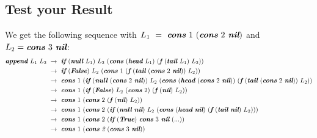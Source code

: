 \documentclass{report}
\begin{document}
		\subsection{Test your Result}
		\startsubsection
			We get the following sequence with $L_1 \ = \ \textit{\textbf{cons} } 1 \ (\textit{\textbf{cons} } 2 \textit{ \textbf{nil}})$ and $L_2 = \textit{\textbf{cons} } 3 \textit{ \textbf{nil}}$:
			\begin{align*}
				\textit{\textbf{append} } L_1 \ L_2 \ & \rightarrow \ \textit{\textbf{if} } (\textit{\textbf{null} } L_1) \ L_2 \ (\textit{\textbf{cons} } (\textit{\textbf{head} } L_1) \ (\textit{\textbf{f} } (\textit{\textbf{tail} } L_1) \ L_2)) \\
				& \rightarrow \ \textit{\textbf{if} } (\textit{\textbf{False}}) \ L_2 \ (\textit{\textbf{cons} } 1 \ (\textit{\textbf{f} } (\textit{\textbf{tail} } (\textit{\textbf{cons} } 2 \textit{ \textbf{nil}})) \ L_2)) \\
				& \rightarrow \ \textit{\textbf{cons} } 1 \ (\textit{\textbf{if} } (\textit{\textbf{null} } (\textit{\textbf{cons} } 2 \textit{ \textbf{nil}})) \ L_2 \ (\textit{\textbf{cons} } (\textit{\textbf{head} } (\textit{\textbf{cons} } 2 \textit{ \textbf{nil}})) \ (\textit{\textbf{f} } (\textit{\textbf{tail} } (\textit{\textbf{cons} } 2 \textit{ \textbf{nil}})) \ L_2)) \\
				& \rightarrow \ \textit{\textbf{cons} } 1 \ (\textit{\textbf{if} } (\textit{\textbf{False}}) \ L_2 \ (\textit{\textbf{cons} } 2) \ (\textit{\textbf{f} } (\textit{\textbf{nil}}) \ L_2)) \\
				& \rightarrow \ \textit{\textbf{cons} } 1 \ (\textit{\textbf{cons} } 2 \ (\textit{\textbf{f} } (\textit{\textbf{nil}}) \ L_2)) \\
				& \rightarrow \ \textit{\textbf{cons} } 1 \ (\textit{\textbf{cons} } 2 \ (\textit{\textbf{if} } (\textit{\textbf{null} } \textit{\textbf{nil}}) \ L_2 \ (\textit{\textbf{cons} } (\textit{\textbf{head} } \textit{\textbf{nil}}) \ (\textit{\textbf{f} } (\textit{\textbf{tail} } \textit{\textbf{nil}}) \ L_2))) \\
				& \rightarrow \ \textit{\textbf{cons} } 1 \ (\textit{\textbf{cons} } 2 \ (\textit{\textbf{if} } (\textit{\textbf{True}}) \ \textit{\textbf{cons} } 3 \textit{ \textbf{nil}} \ (...)) \\
				& \rightarrow \ \textit{\textbf{cons} } 1 \ (\textit{\textbf{cons} 2} \ (\textit{\textbf{cons} } 3 \textit{ \textbf{nil}}))
			\end{align*}
		\closesection
	\closesection
\end{document}
